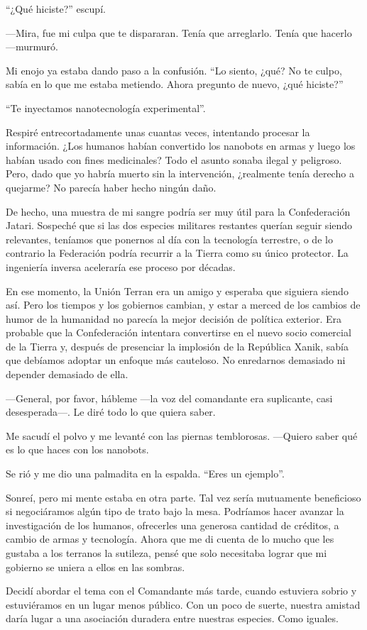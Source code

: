``¿Qué hiciste?''
 escupí.

—Mira, fue mi culpa que te dispararan. Tenía que arreglarlo. Tenía que hacerlo —murmuró.

Mi enojo ya estaba dando paso a la confusión. ``Lo siento, ¿qué? No te culpo, sabía en lo que me estaba metiendo. Ahora pregunto de nuevo, ¿qué hiciste?''


``Te inyectamos nanotecnología experimental''.

Respiré entrecortadamente unas cuantas veces, intentando procesar la información. ¿Los humanos habían convertido los nanobots en armas y luego los habían usado con fines medicinales? Todo el asunto sonaba ilegal y peligroso. Pero, dado que yo habría muerto sin la intervención, ¿realmente tenía derecho a quejarme? No parecía haber hecho ningún daño.

De hecho, una muestra de mi sangre podría ser muy útil para la Confederación Jatari. Sospeché que si las dos especies militares restantes querían seguir siendo relevantes, teníamos que ponernos al día con la tecnología terrestre, o de lo contrario la Federación podría recurrir a la Tierra como su único protector. La ingeniería inversa aceleraría ese proceso por décadas.

En ese momento, la Unión Terran era un amigo y esperaba que siguiera siendo así. Pero los tiempos y los gobiernos cambian, y estar a merced de los cambios de humor de la humanidad no parecía la mejor decisión de política exterior. Era probable que la Confederación intentara convertirse en el nuevo socio comercial de la Tierra y, después de presenciar la implosión de la República Xanik, sabía que debíamos adoptar un enfoque más cauteloso. No enredarnos demasiado ni depender demasiado de ella.

—General, por favor, hábleme —la voz del comandante era suplicante, casi desesperada—. Le diré todo lo que quiera saber.

Me sacudí el polvo y me levanté con las piernas temblorosas. —Quiero saber qué es lo que haces con los nanobots.

Se rió y me dio una palmadita en la espalda. ``Eres un ejemplo''.

Sonreí, pero mi mente estaba en otra parte. Tal vez sería mutuamente beneficioso si negociáramos algún tipo de trato bajo la mesa. Podríamos hacer avanzar la investigación de los humanos, ofrecerles una generosa cantidad de créditos, a cambio de armas y tecnología. Ahora que me di cuenta de lo mucho que les gustaba a los terranos la sutileza, pensé que solo necesitaba lograr que mi gobierno se uniera a ellos en las sombras.

Decidí abordar el tema con el Comandante más tarde, cuando estuviera sobrio y estuviéramos en un lugar menos público. Con un poco de suerte, nuestra amistad daría lugar a una asociación duradera entre nuestras especies. Como iguales.

